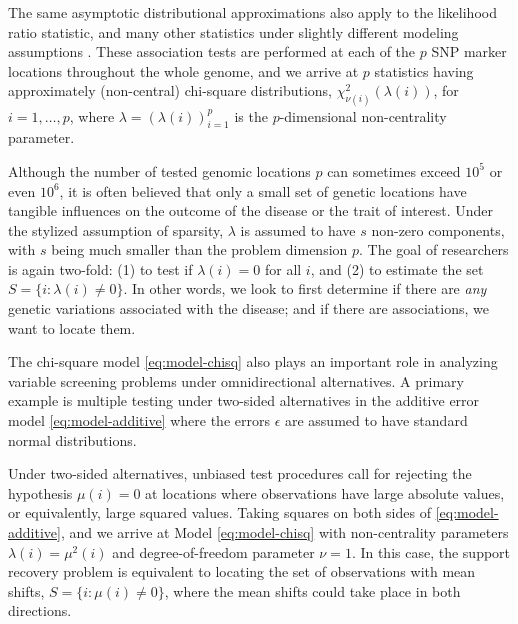 The same asymptotic distributional approximations also apply to the likelihood ratio statistic, and many other statistics under slightly different modeling assumptions \citep{gao2019upass}.
These association tests are performed at each of the $p$ SNP marker locations throughout the whole genome, and we arrive at $p$ statistics having approximately (non-central) chi-square distributions, $\chi_{\nu(i)}^2\left(\lambda(i)\right)$, for $i=1,\ldots,p$,
where $\lambda = (\lambda(i))_{i=1}^p$ is the $p$-dimensional non-centrality parameter.

Although the number of tested genomic locations $p$ can sometimes exceed $10^5$ or even $10^6$, it is often believed that only a small set of genetic locations have tangible influences on the outcome of the disease or the trait of interest.
Under the stylized assumption of sparsity, $\lambda$ is assumed to have $s$ non-zero components, with $s$ being much smaller than the problem dimension $p$. 
The goal of researchers is again two-fold: (1) to test if $\lambda(i)=0$ for all $i$, and (2) to estimate the set $S=\{i:\lambda(i)\neq 0\}$.
In other words, we look to first determine if there are \emph{any} genetic variations associated with the disease; and if there are associations, we want to locate them.

\medskip

The chi-square model \eqref{eq:model-chisq} also plays an important role in analyzing variable screening problems under omnidirectional alternatives.
A primary example is multiple testing under two-sided alternatives in the additive error model \eqref{eq:model-additive} where the errors $\epsilon$ are assumed to have standard normal distributions.

Under two-sided alternatives, unbiased test procedures call for rejecting the hypothesis $\mu(i)=0$ at locations where observations have large absolute values, or equivalently, large squared values.
Taking squares on both sides of \eqref{eq:model-additive}, and we arrive at Model \eqref{eq:model-chisq} with non-centrality parameters $\lambda(i) = \mu^2(i)$ and degree-of-freedom parameter $\nu =1$.
In this case, the support recovery problem is equivalent to locating the set of observations with mean shifts, $S=\{i:\mu(i)\neq 0\}$, where the mean shifts could take place in both directions.

